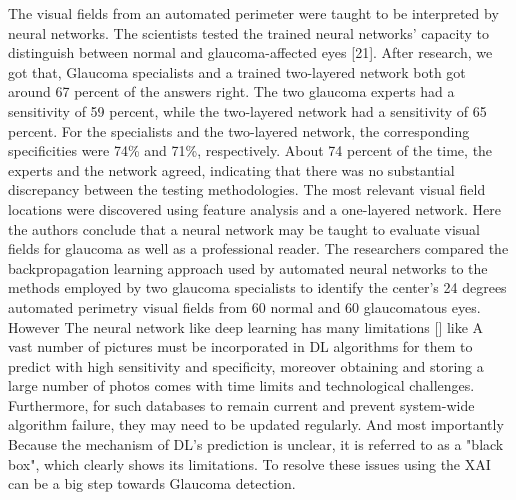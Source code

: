\vspace{5mm}
The visual fields from an automated perimeter were taught to be interpreted by neural networks. The scientists tested the trained neural networks' capacity to distinguish between normal and glaucoma-affected eyes [21]. After research, we got that, Glaucoma specialists and a trained two-layered network both got around 67 percent of the answers right. The two glaucoma experts had a sensitivity of 59 percent, while the two-layered network had a sensitivity of 65 percent. For the specialists and the two-layered network, the corresponding specificities were 74\% and 71\%, respectively. About 74 percent of the time, the experts and the network agreed, indicating that there was no substantial discrepancy between the testing methodologies. The most relevant visual field locations were discovered using feature analysis and a one-layered network. Here the authors conclude that a neural network may be taught to evaluate visual fields for glaucoma as well as a professional reader. The researchers compared the backpropagation learning approach used by automated neural networks to the methods employed by two glaucoma specialists to identify the center’s 24 degrees automated perimetry visual fields from 60 normal and 60 glaucomatous eyes. However The neural network like deep learning has many limitations [] like A vast number of pictures must be incorporated in DL algorithms for them to predict with high sensitivity and specificity, moreover obtaining and storing a large number of photos comes with time limits and technological challenges. Furthermore, for such databases to remain current and prevent system-wide algorithm failure, they may need to be updated regularly. And most importantly Because the mechanism of DL's prediction is unclear, it is referred to as a "black box", which clearly shows its limitations. To resolve these issues using the XAI can be a big step towards Glaucoma detection.

